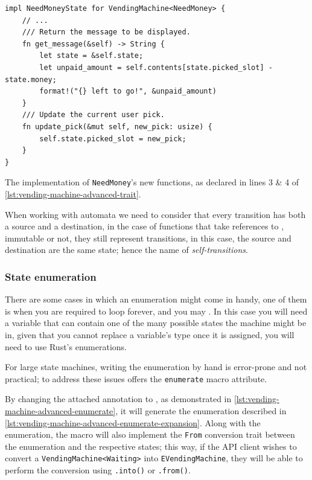 \begin{listing}
    \begin{verbatim}
impl NeedMoneyState for VendingMachine<NeedMoney> {
    // ...
    /// Return the message to be displayed.
    fn get_message(&self) -> String {
        let state = &self.state;
        let unpaid_amount = self.contents[state.picked_slot] - state.money;
        format!("{} left to go!", &unpaid_amount)
    }
    /// Update the current user pick.
    fn update_pick(&mut self, new_pick: usize) {
        self.state.picked_slot = new_pick;
    }
}
    \end{verbatim}
    \caption{The implementation of \textcolor{structblue}{\texttt{NeedMoney}}'s new functions, as declared in lines 3 \& 4 of \autoref{lst:vending-machine-advanced-trait}.}
    \label{lst:vending-machine-advanced-trait-impl}
\end{listing}

When working with automata we need to consider that every transition has both a source and a destination,
in the case of functions that take references to , immutable or not,
they still represent transitions, in this case, the source and destination are the same state;
hence the name of \emph{self-transitions}.

\subsubsection{State enumeration}

There are some cases in which an enumeration might come in handy,
one of them is when you are required to loop forever,
and you may  .
In this case you will need a variable that can contain one of the many possible states the machine might be in,
given that you cannot replace a variable's type once it is assigned, you will need to use Rust's enumerations.

For large state machines, writing the enumeration by hand is error-prone and not practical;
to address these issues \textcolor{attrgreen}{} offers the \textcolor{attrgreen}{\texttt{enumerate}} macro attribute.

By changing the attached \textcolor{attrgreen}{} annotation to \textcolor{attrgreen}{},
as demonstrated in \autoref{lst:vending-machine-advanced-enumerate},
it will generate the enumeration described in \autoref{lst:vending-machine-advanced-enumerate-expansion}.
Along with the enumeration, the macro will also implement the \texttt{From} conversion trait between the enumeration and the respective states;
this way, if the API client wishes to convert a \texttt{VendingMachine<Waiting>} into \texttt{EVendingMachine},
they will be able to perform the conversion using \texttt{.into()} or \texttt{.from()}.

